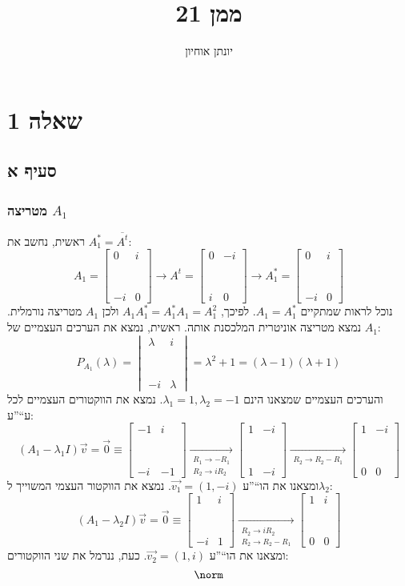 \documentclass[11pt, oneside]{article}
\title{ממן 21}
\author{יונתן אוחיון}
\newcommand{\br}{\\\\\\\\\\\\\\}
\newcommand{\opr}[1]{\xrightarrow[\text{#1}]{}}
\newcommand{\oprm}[1]{\underset{\substack{#1}}{\longrightarrow}}
\newcommand{\conj}[1]{#1^{*}}
\newcommand{\mfr}[4]{\begin{bmatrix}#1 & #2\br #3 & #4\end{bmatrix}}
\newcommand{\mfd}[4]{\begin{vmatrix}#1 & #2\br #3 & #4\end{vmatrix}}
\begin{document}
\maketitle

\section*{שאלה 1}
\subsection*{סעיף א}
\subsubsection*{מטריצה $A_{1}$}
ראשית, נחשב את $\conj{A_{1}} = \overline{A^{t}}$:
\[
A_{1} = \mfr{0}{i}{-i}{0}
\opr{} A^{t} = \mfr{0}{-i}{i}{0}
\opr{} \conj{A_{1}} = \mfr{0}{i}{-i}{0}
\]
נוכל לראות שמתקיים $A_{1} = \conj{A_{1}}$. לפיכך, $A_{1}\conj{A_{1}} = \conj{A_{1}}A_{1} = A^{2}_{1}$ ולכן $A_{1}$ מטריצה נורמלית. נמצא מטריצה אוניטרית המלכסנת אותה. ראשית, נמצא את הערכים העצמיים של $A_{1}$:
\[
P_{A_{1}}(\lambda) = \mfd{\lambda}{i}{-i}{\lambda} = \lambda^{2} + 1 = (\lambda - 1)(\lambda + 1)
\]
והערכים העצמיים שמצאנו הינם $\lambda_{1} = 1, \lambda_{2} = -1$. נמצא את הווקטורים העצמיים לכל ע``''ע:
\[
(A_{1} - \lambda_{1}I)\vec{v} = \vec{0} \equiv \mfr{-1}{i}{-i}{-1}
\oprm{R_{1} \to -R_{1}\\R_{2} \to iR_{2}} \mfr{1}{-i}{1}{-i}
\oprm{R_{2} \to R_{2} - R_{1}} \mfr{1}{-i}{0}{0}
\]
ומצאנו את הו``''ע $\vec{v_{1}} = (1, -i)$. נמצא את הווקטור העצמי המשוייך ל$\lambda_{2}$:
\[
(A_{1} - \lambda_{2}I)\vec{v} = \vec{0} \equiv \mfr{1}{i}{-i}{1}
\oprm{R_{2} \to iR_{2}\\R_{2} \to R_{2} - R_{1}} \mfr{1}{i}{0}{0}
\]
ומצאנו את הו``''ע $\vec{v_{2}} = (1, i)$. כעת, ננרמל את שני הווקטורים:
\[
\norm
\]

\end{document}
